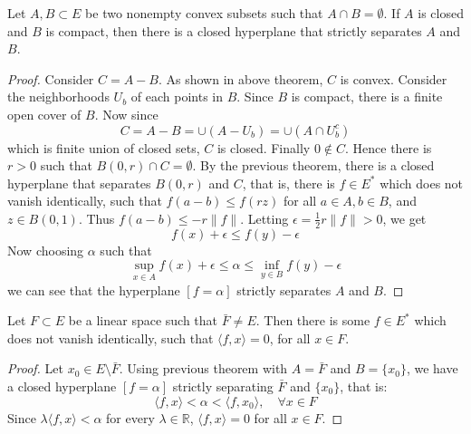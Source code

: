 \begin{thm} Let $A,B\subset E$ be two nonempty convex subsets such that $A\cap B=\emptyset$. If $A$ is closed and $B$ is compact, then there is a closed hyperplane that strictly separates $A$ and $B$.
\end{thm}
\begin{proof}
Consider $C=A-B$. As shown in above theorem, $C$ is convex. Consider the neighborhoods $U_b$ of each points in $B$. Since $B$ is compact, there is a finite open cover of $B$. Now since
\begin{equation}
C=A-B=\cup (A-U_b)=\cup(A\cap U_b^c)
\end{equation}
which is finite union of closed sets, $C$ is closed. Finally $0\notin C$. Hence there is $r>0$ such that $B(0,r)\cap C=\emptyset$. By the previous theorem, there is a closed hyperplane that separates $B(0,r)$ and $C$, that is, there is $f\in E^*$ which does not vanish identically, such that $f(a-b)\leq f(rz)$ for all $a\in A, b\in B$, and $z\in B(0,1)$. Thus $f(a-b)\leq -r\|f\|$. Letting $\epsilon=\frac{1}{2}r\|f\|>0$, we get
\begin{equation}
f(x)+\epsilon\leq f(y)-\epsilon
\end{equation}
Now choosing $\alpha$ such that
\begin{equation}
\sup_{x\in A} f(x)+\epsilon \leq \alpha \leq \inf_{y\in B}f(y)-\epsilon
\end{equation}
we can see that the hyperplane $[f=\alpha]$ strictly separates $A$ and $B$.
\end{proof}

\begin{cor} Let $F\subset E$ be a linear space such that $\bar{F}\neq E$. Then there is some $f\in E^*$ which does not vanish identically, such that $\langle f,x\rangle=0$, for all $x\in F$.
\end{cor}
\begin{proof}
Let $x_0\in E\setminus \bar{F}$. Using previous theorem with $A=\bar{F}$ and $B=\{x_0\}$, we have a closed hyperplane $[f=\alpha]$ strictly separating $\bar{F}$ and $\{x_0\}$, that is:
\begin{equation}
\langle f,x\rangle<\alpha<\langle f,x_0\rangle,\quad \forall x\in F
\end{equation}
Since $\lambda\langle f,x\rangle<\alpha$ for every $\lambda\in \mathbb{R}$, $\langle f,x\rangle=0$ for all $x\in F$.
\end{proof}

